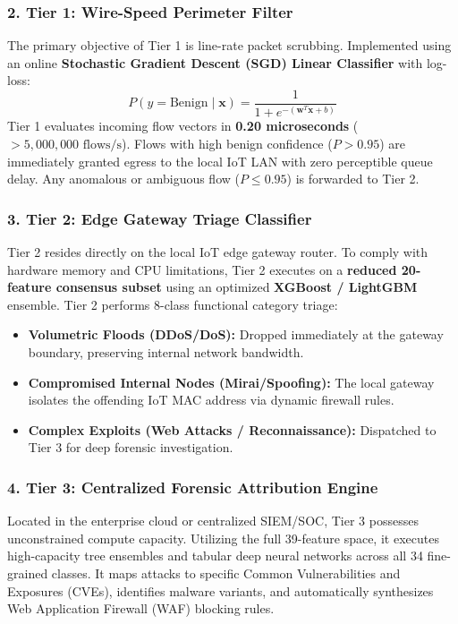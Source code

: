 \documentclass[12pt,a4paper]{report}
\begin{document}
\subsubsection{2. Tier 1: Wire-Speed Perimeter Filter}
The primary objective of Tier 1 is line-rate packet scrubbing. Implemented using an online \textbf{Stochastic Gradient Descent (SGD) Linear Classifier} with log-loss:
\begin{equation}
    P(y = \text{Benign} \mid \mathbf{x}) = \frac{1}{1 + e^{-(\mathbf{w}^T \mathbf{x} + b)}}
\end{equation}
Tier 1 evaluates incoming flow vectors in \textbf{0.20 microseconds} ($>5,000,000\text{ flows/s}$). Flows with high benign confidence ($P > 0.95$) are immediately granted egress to the local IoT LAN with zero perceptible queue delay. Any anomalous or ambiguous flow ($P \le 0.95$) is forwarded to Tier 2.

\subsubsection{3. Tier 2: Edge Gateway Triage Classifier}
Tier 2 resides directly on the local IoT edge gateway router. To comply with hardware memory and CPU limitations, Tier 2 executes on a \textbf{reduced 20-feature consensus subset} using an optimized \textbf{XGBoost / LightGBM} ensemble. Tier 2 performs 8-class functional category triage:
\begin{itemize}
    \item \textbf{Volumetric Floods (DDoS/DoS):} Dropped immediately at the gateway boundary, preserving internal network bandwidth.
    \item \textbf{Compromised Internal Nodes (Mirai/Spoofing):} The local gateway isolates the offending IoT MAC address via dynamic firewall rules.
    \item \textbf{Complex Exploits (Web Attacks / Reconnaissance):} Dispatched to Tier 3 for deep forensic investigation.
\end{itemize}

\subsubsection{4. Tier 3: Centralized Forensic Attribution Engine}
Located in the enterprise cloud or centralized SIEM/SOC, Tier 3 possesses unconstrained compute capacity. Utilizing the full 39-feature space, it executes high-capacity tree ensembles and tabular deep neural networks across all 34 fine-grained classes. It maps attacks to specific Common Vulnerabilities and Exposures (CVEs), identifies malware variants, and automatically synthesizes Web Application Firewall (WAF) blocking rules.
\end{document}
